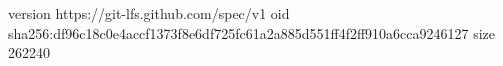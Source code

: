version https://git-lfs.github.com/spec/v1
oid sha256:df96c18c0e4accf1373f8e6df725fc61a2a885d551ff4f2ff910a6cca9246127
size 262240
